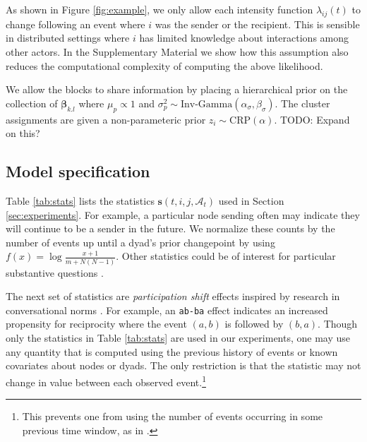 As shown in Figure \ref{fig:example}, we only allow each intensity function $\lambda_{ij}(t)$ to change following an event where $i$ was the sender or the recipient.
This is sensible in distributed settings where $i$ has limited knowledge about interactions among other actors.
In the Supplementary Material we show how this assumption also reduces the computational complexity of computing the above likelihood.

We allow the blocks to share information by placing a hierarchical prior on the collection of $\boldsymbol{\beta}_{k.l}$ where $\mu_p \propto 1$ and $\sigma_p^2 \sim \mbox{Inv-Gamma}(\alpha_{\sigma},\beta_{\sigma})$.
The cluster assignments are given a non-parameteric prior $z_i \sim \mbox{CRP}(\alpha)$.
{\color{red} TODO: Expand on this?}

\subsection{Model specification}
\label{sec:specification}


Table \ref{tab:stats}  lists the statistics  $\mathbf{s}(t,i,j,\mathcal{A}_t)$ used in Section \ref{sec:experiments}.
For example, a particular node sending often may indicate they will continue to be a sender in the future.
We normalize these counts by the number of events up until a dyad's prior changepoint by using $f(x) = \log \frac{x+1}{m + N(N-1)}$. %
Other statistics could be of interest for particular substantive questions \cite{Butts2008,Vu2011}.  

The next set of statistics are \emph{participation shift} effects inspired by research in conversational norms \cite{Gibson2003}.
For example, an \texttt{ab-ba} effect indicates an increased propensity for reciprocity where the event $(a,b)$ is followed by $(b,a)$.
Though only the statistics in Table \ref{tab:stats} are used in our experiments, one may use any quantity that is computed using the previous history of events or known covariates about nodes or dyads.
The only restriction is that the statistic may not change in value between each observed event.\footnote{This prevents one from using the number of events occurring in some previous time window, as in \cite{Gunawardana2011}.}

